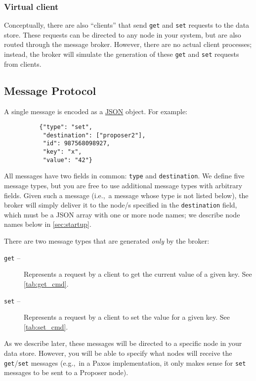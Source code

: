 \documentclass[12pt]{article}
\begin{document}
\subsubsection{Virtual client}

Conceptually, there are also ``clients'' that send {\tt get} and {\tt set} requests to the data store. These requests can be directed to any node in your system, but are also routed through the message broker. However, there are no actual client processes; instead, the broker will simulate the generation of these {\tt get} and {\tt set} requests from clients.

\subsection{Message Protocol}
\label{sec:protocol}

A single message is encoded as a \href{http://zeromq.org/}{JSON} object. For example:

\begin{verbatim}
          {"type": "set", 
           "destination": ["proposer2"], 
           "id": 987568098927, 
           "key": "x", 
           "value": "42"}
\end{verbatim}

All messages have two fields in common: {\tt type} and {\tt destination}. We define five message types, but you are free to use additional message types with arbitrary fields. Given such a message (i.e.,~a message whose type is not listed below), the broker will simply deliver it to the node/s specified in the  {\tt destination} field, which must be a JSON array with one or more node names; we describe node names below in \cref{sec:startup}.

There are two message types that are generated \emph{only} by the broker:

\begin{description}
\item[{\tt get} --] Represents a request by a client to get the current value of a given key. See \cref{tab:get_cmd}.
\item[{\tt set} --] Represents a request by a client to set the value for a given key. See \cref{tab:set_cmd}.
\end{description}

As we describe later, these messages will be directed to a specific node in your data store. However, you will be able to specify what nodes will receive the {\tt get}/{\tt set} messages (e.g.,~in a Paxos implementation, it only makes sense for {\tt set} messages to be sent to a Proposer node).
\end{document}
